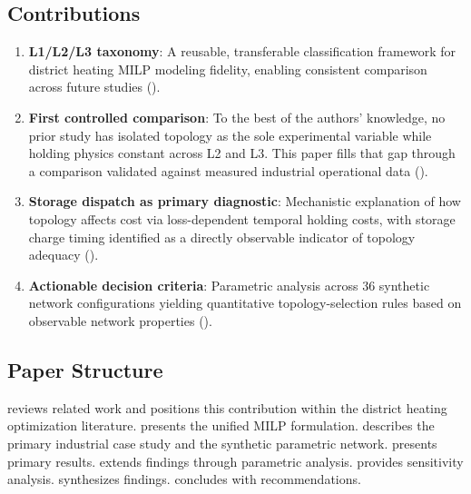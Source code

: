 \documentclass[review,3p]{elsarticle}
\begin{document}
\subsection{Contributions}
\label{sec:contributions}

\begin{enumerate}
    \item \textbf{L1/L2/L3 taxonomy}: A reusable, transferable
    classification framework for district heating MILP modeling
    fidelity, enabling consistent comparison across future studies
    ().

    \item \textbf{First controlled comparison}: To the best of the
    authors' knowledge, no prior study has isolated topology as the
    sole experimental variable while holding physics constant across
    L2 and L3. This paper fills that gap through a comparison
    validated against measured industrial operational data
    ().

    \item \textbf{Storage dispatch as primary diagnostic}: Mechanistic
    explanation of how topology affects cost via loss-dependent
    temporal holding costs, with storage charge timing identified as
    a directly observable indicator of topology adequacy
    ().

    \item \textbf{Actionable decision criteria}: Parametric analysis
    across 36 synthetic network configurations yielding quantitative
    topology-selection rules based on observable network properties
    ().
\end{enumerate}

\subsection{Paper Structure}

 reviews related work and positions this
contribution within the district heating optimization literature.
 presents the unified MILP formulation.
 describes the primary industrial case study
and the synthetic parametric network.
 presents primary results.
 extends findings through parametric
analysis.  provides sensitivity analysis.
 synthesizes findings.
 concludes with recommendations.
\end{document}
